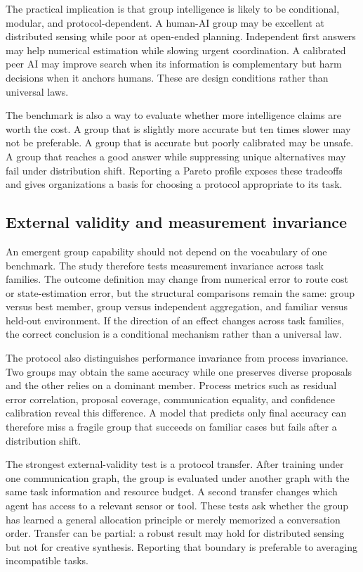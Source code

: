 \documentclass[conference]{IEEEtran}
\begin{document}
The practical implication is that group intelligence is likely to be conditional, modular, and protocol-dependent. A human-AI group may be excellent at distributed sensing while poor at open-ended planning. Independent first answers may help numerical estimation while slowing urgent coordination. A calibrated peer AI may improve search when its information is complementary but harm decisions when it anchors humans. These are design conditions rather than universal laws.

The benchmark is also a way to evaluate whether more intelligence claims are worth the cost. A group that is slightly more accurate but ten times slower may not be preferable. A group that is accurate but poorly calibrated may be unsafe. A group that reaches a good answer while suppressing unique alternatives may fail under distribution shift. Reporting a Pareto profile exposes these tradeoffs and gives organizations a basis for choosing a protocol appropriate to its task.

\subsection{External validity and measurement invariance}

An emergent group capability should not depend on the vocabulary of one benchmark. The study therefore tests measurement invariance across task families. The outcome definition may change from numerical error to route cost or state-estimation error, but the structural comparisons remain the same: group versus best member, group versus independent aggregation, and familiar versus held-out environment. If the direction of an effect changes across task families, the correct conclusion is a conditional mechanism rather than a universal law.

The protocol also distinguishes performance invariance from process invariance. Two groups may obtain the same accuracy while one preserves diverse proposals and the other relies on a dominant member. Process metrics such as residual error correlation, proposal coverage, communication equality, and confidence calibration reveal this difference. A model that predicts only final accuracy can therefore miss a fragile group that succeeds on familiar cases but fails after a distribution shift.

The strongest external-validity test is a protocol transfer. After training under one communication graph, the group is evaluated under another graph with the same task information and resource budget. A second transfer changes which agent has access to a relevant sensor or tool. These tests ask whether the group has learned a general allocation principle or merely memorized a conversation order. Transfer can be partial: a robust result may hold for distributed sensing but not for creative synthesis. Reporting that boundary is preferable to averaging incompatible tasks.
\end{document}

